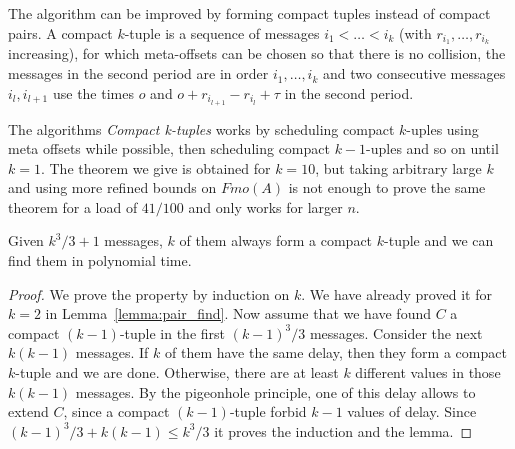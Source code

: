 \documentclass[a4paper,UKenglish,cleveref, autoref, thm-restate]{lipics-v2019}
\begin{document}
The algorithm can be improved by forming compact tuples instead of compact pairs.
A compact $k$-tuple is a sequence of messages $i_1 < \dots < i_k$ (with $r_{i_1},\dots,r_{i_k}$ increasing), for which meta-offsets can be chosen so that there is no collision,
the messages in the second period are in order $i_1,\dots,i_k$ and two consecutive messages $i_{l},i_{l+1}$ use the times $o$ and $o + r_{i_{l+1}} -r_{i_{l}} + \tau$ in the second period.

The algorithms \emph{Compact k-tuples} works by scheduling compact $k$-uples
using meta offsets while possible, then scheduling compact $k-1$-uples and so on until $k=1$.
The theorem we give is obtained for $k=10$, but taking arbitrary large $k$ and using more refined bounds on $Fmo(A)$ is not enough to prove the same theorem for a load of $41/100$ and only works for larger $n$.


\begin{lemma}\label{lemma:uple_find}
Given $k^3/3 + 1$ messages, $k$ of them always form a compact $k$-tuple and we can find them in polynomial time. 
\end{lemma}
\begin{proof}
We prove the property by induction on $k$. We have already proved it for $k=2$ in Lemma~\ref{lemma:pair_find}.
Now assume that we have found $C$ a compact $(k-1)$-tuple in the first $(k-1)^3/3$
messages. Consider the next $k(k-1)$ messages. If $k$ of them have the same delay,
then they form a compact $k$-tuple and we are done. Otherwise, there are at least $k$ different values
in those $k(k-1)$ messages. By the pigeonhole principle, one of this delay allows to extend $C$, since 
a compact $(k-1)$-tuple forbid $k-1$ values of delay. Since $(k-1)^3/3 + k(k-1) \leq k^3/3$ it proves the induction and the lemma.
\end{proof}
\end{document}
